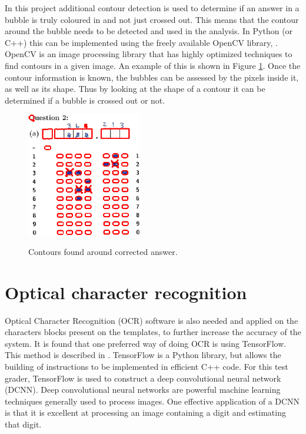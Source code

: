In this project additional contour detection is used to determine if an answer in a bubble is truly coloured in and not just crossed out. This means that the contour around the bubble needs to be detected and used in the analysis. In Python (or C++) this can be implemented using the freely available OpenCV library,  \citet{AdrianR2016}. OpenCV is an image processing library that has highly optimized techniques to find contours in a given image. An example of this is shown in Figure \ref{fig:Cross}. Once the contour information is known, the bubbles can be assessed by the pixels inside it, as well as its shape. Thus by looking at the shape of a contour it can be determined if a bubble is crossed out or not.
\begin{figure}
  \centering
  \includegraphics[width=5cm]{Cross}\\
  \caption{Contours found around corrected answer.}
  \label{fig:Cross}
\end{figure}

\section{Optical character recognition}
Optical Character Recognition (OCR) software is also needed and applied on the characters blocks present on the templates, to further increase the accuracy of the system. It is found that one preferred way of doing OCR is using TensorFlow. This method is described in \citet{Tensor}. TensorFlow is a Python library, but allows the building of instructions to be implemented in ef{f}icient C++ code. For this test grader, TensorFlow is used to construct a deep convolutional neural network (DCNN). Deep convolutional neural networks are powerful machine learning techniques generally used to process images. One effective application of a DCNN is that it is excellent at processing an image containing a digit and estimating that digit.

